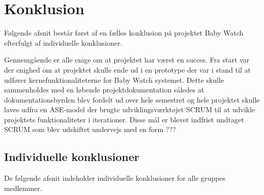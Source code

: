 \chapter{Konklusion}
Følgende afsnit består først af en fælles konklusion på projektet Baby Watch efterfulgt af individuelle konklusioner.

Gennemgående er alle enige om at projektet har været en succes. Fra start var der enighed om at projektet skulle ende ud i en prototype der var i stand til at udfører kernefunktionaliteterne for Baby Watch systemet. Dette skulle sammenholdes med en løbende projektdokumentation således at dokumentationsbyrden blev fordelt ud over hele semestret og hele projektet skulle laves udfra en ASE-model der brugte udviklingsværktøjet SCRUM til at udvikle projektets funktionaliteter i iterationer. Disse mål er blevet indfriet undtaget SCRUM som blev udskiftet undervejs med en form ???


\section{Individuelle konklusioner}

De følgende afsnit indeholder individuelle konklusioner for alle gruppes medlemmer.












